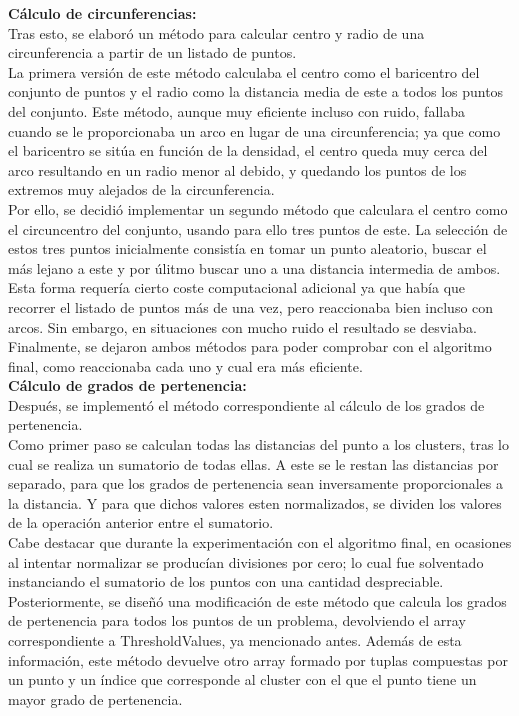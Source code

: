 \documentclass[conference,a4paper]{IEEEtran}
\begin{document}
\textbf{Cálculo de circunferencias:}\\

Tras esto, se elaboró un método para calcular centro y radio de una circunferencia a partir de un listado de puntos.\\ 
La primera versión de este método calculaba el centro como el baricentro del conjunto de puntos y el radio como la distancia media de este a todos los puntos del conjunto. Este método, aunque muy eficiente incluso con ruido, fallaba cuando se le proporcionaba un arco en lugar de una circunferencia; ya que como el baricentro se sitúa en función de la densidad, el centro queda muy cerca del arco resultando en un radio menor al debido, y quedando los puntos de los extremos muy alejados de la circunferencia.\\
Por ello, se decidió implementar un segundo método que calculara el centro como el circuncentro del conjunto, usando para ello tres puntos de este. La selección de estos tres puntos inicialmente consistía en tomar un punto aleatorio, buscar el más lejano a este y por úlitmo buscar uno a una distancia intermedia de ambos. Esta forma requería cierto coste computacional adicional ya que había que recorrer el listado de puntos más de una vez, pero reaccionaba bien incluso con arcos. Sin embargo, en situaciones con mucho ruido el resultado se desviaba. \\
Finalmente, se dejaron ambos métodos para poder comprobar con el algoritmo final, como reaccionaba cada uno y cual era más eficiente.\\

\textbf{Cálculo de grados de pertenencia:}\\

Después, se implementó el método correspondiente al cálculo de los grados de pertenencia.\\
Como primer paso se calculan todas las distancias del punto a los clusters, tras lo cual se realiza un sumatorio de todas ellas. A este se le restan las distancias por separado, para que los grados de pertenencia sean inversamente proporcionales a la distancia. Y para que dichos valores esten normalizados, se dividen los valores de la operación anterior entre el sumatorio.\\
Cabe destacar que durante la experimentación con el algoritmo final, en ocasiones al intentar normalizar se producían divisiones por cero; lo cual fue solventado instanciando el sumatorio de los puntos con una cantidad despreciable.\\
Posteriormente, se diseñó una modificación de este método que calcula los grados de pertenencia para todos los puntos de un problema, devolviendo el array correspondiente a ThresholdValues, ya mencionado antes. Además de esta información, este método devuelve otro array formado por tuplas compuestas por un punto y un índice que corresponde al cluster con el que el punto tiene un mayor grado de pertenencia.\\
\end{document}
